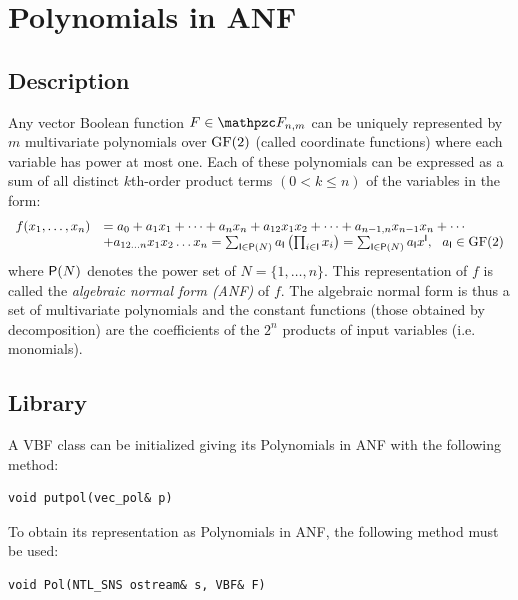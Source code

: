 \section{Polynomials in ANF}
\label{sec:Pol}

\subsection{Description}

\begin{definition}
Any vector Boolean function $F \in \funct{F}_{n,m}$ can be uniquely represented by $m$
  multivariate polynomials over $\gf{GF(2)}$ (called coordinate functions)
  where each variable has power at most one. Each of these polynomials can be
  expressed as a sum of all distinct $k$th-order product terms $(0 < k \leq
  n)$ of the variables in the form: 
\begin{equation}
\begin{array}{ll}
f(x_1,\dots,x_n) &= a_0+a_1 x_1+\dotsb+a_n
x_n+a_{12}x_1x_2+\dotsb+a_{n-1,n}x_{n-1}x_n+\dotsb \\ &+a_{12\dots n}x_1x_2\dots x_n 
= \sum_{\set{I} \in \set{P}(N)} a_{\set{I}}\left(\prod_{i \in \set{I}} x_i\right) = \sum_{\set{I} \in \set{P}(N)} a_{\set{I}} x^{\set{I}}, \ \ a_{\set{I}} \in \gf{GF(2)}
\end{array}
\end{equation}
where $\set{P}(N)$ denotes the power set of $N=\{1,\dots,n\}$. This representation of $f$ is called the \textit{algebraic normal form (ANF)}\label{sym:ANF} of $f$. The algebraic normal form is thus a set of multivariate polynomials and the constant functions (those obtained by decomposition) are the coefficients of the $2^n$ products of input variables (i.e. monomials).
\end{definition}

\subsection{Library}

A VBF class can be initialized giving its Polynomials in ANF with the following method:

\begin{verbatim}
void putpol(vec_pol& p)
\end{verbatim}

To obtain its representation as Polynomials in ANF, the following method must be used:

\begin{verbatim}
void Pol(NTL_SNS ostream& s, VBF& F)
\end{verbatim}

